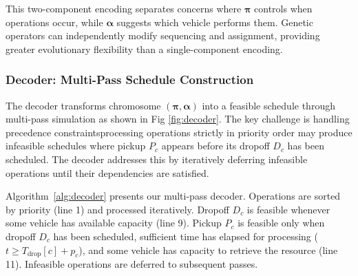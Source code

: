\documentclass{article}
\begin{document}
This two-component encoding separates concerns where $\boldsymbol{\pi}$ controls when operations occur, while $\boldsymbol{\alpha}$ suggests which vehicle performs them. Genetic operators can independently modify sequencing and assignment, providing greater evolutionary flexibility than a single-component encoding.

\subsubsection{Decoder: Multi-Pass Schedule Construction}

The decoder transforms chromosome $(\boldsymbol{\pi}, \boldsymbol{\alpha})$ into a feasible schedule through multi-pass simulation as shown in Fig \ref{fig:decoder}. The key challenge is handling precedence constraints\textemdash processing operations strictly in priority order may produce infeasible schedules where pickup $P_c$ appears before its dropoff $D_c$ has been scheduled. The decoder addresses this by iteratively deferring infeasible operations until their dependencies are satisfied.

Algorithm~\ref{alg:decoder} presents our multi-pass decoder. Operations are sorted by priority (line 1) and processed iteratively. Dropoff $D_c$ is feasible whenever some vehicle has available capacity (line 9). Pickup $P_c$ is feasible only when dropoff $D_c$ has been scheduled, sufficient time has elapsed for processing ($t \geq T_{\text{drop}}[c] + p_c$), and some vehicle has capacity to retrieve the resource (line 11). Infeasible operations are deferred to subsequent passes.
\end{document}
